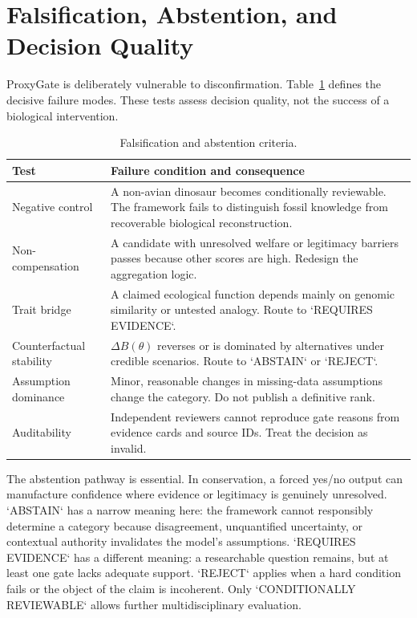 \documentclass[conference]{IEEEtran}
\begin{document}
\section{Falsification, Abstention, and Decision Quality}

ProxyGate is deliberately vulnerable to disconfirmation. Table~\ref{tab:falsify} defines the decisive failure modes. These tests assess decision quality, not the success of a biological intervention.

\begin{table}[t]
\caption{Falsification and abstention criteria.}
\label{tab:falsify}
\centering
\footnotesize
\setlength{\tabcolsep}{2.5pt}
\begin{tabular}{p{} p{}}
\toprule
\textbf{Test} & \textbf{Failure condition and consequence} \\
\midrule
Negative control & A non-avian dinosaur becomes conditionally reviewable. The framework fails to distinguish fossil knowledge from recoverable biological reconstruction. \\
Non-compensation & A candidate with unresolved welfare or legitimacy barriers passes because other scores are high. Redesign the aggregation logic. \\
Trait bridge & A claimed ecological function depends mainly on genomic similarity or untested analogy. Route to `REQUIRES EVIDENCE`. \\
Counterfactual stability & $\Delta B(\theta)$ reverses or is dominated by alternatives under credible scenarios. Route to `ABSTAIN` or `REJECT`. \\
Assumption dominance & Minor, reasonable changes in missing-data assumptions change the category. Do not publish a definitive rank. \\
Auditability & Independent reviewers cannot reproduce gate reasons from evidence cards and source IDs. Treat the decision as invalid. \\
\bottomrule
\end{tabular}
\end{table}

The abstention pathway is essential. In conservation, a forced yes/no output can manufacture confidence where evidence or legitimacy is genuinely unresolved. `ABSTAIN` has a narrow meaning here: the framework cannot responsibly determine a category because disagreement, unquantified uncertainty, or contextual authority invalidates the model's assumptions. `REQUIRES EVIDENCE` has a different meaning: a researchable question remains, but at least one gate lacks adequate support. `REJECT` applies when a hard condition fails or the object of the claim is incoherent. Only `CONDITIONALLY REVIEWABLE` allows further multidisciplinary evaluation.
\end{document}
